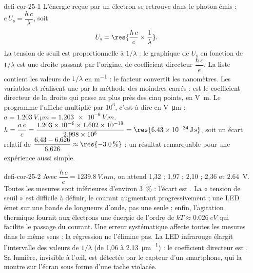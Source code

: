 \begin{blocEdition}{defi-cor-25-1}
L'énergie reçue par un électron se retrouve dans le photon émis : $e\,U_\mathrm{s}=\dfrac{h\,c}{\lambda}$, soit
\[U_\mathrm{s}=\res{\frac{h\,c}{e}\times\frac{1}{\lambda}}.\]
La tension de seuil est proportionnelle à $1/\lambda$ : le graphique de $U_\mathrm{s}$ en fonction de $1/\lambda$ est une droite passant
par l'origine, de coefficient directeur $\dfrac{h\,c}{e}$.
La liste  contient les valeurs de $1/\lambda$ en \unit{m^{-1}} : le facteur  convertit les nanomètres. Les
variables  et  réalisent une  par la méthode des moindres carrés :  est le
coefficient directeur de la droite qui passe au plus près des cinq points, en \unit{V.m}. Le programme l'affiche
multiplié par $10^6$, c'est-à-dire en \unit{V.\micro m} : $a=\qty{1,203}{V.\micro m}=\qty{1,203e-6}{V.m}$.
$h=\dfrac{a\,e}{c}=\dfrac{\num{1.203e-6}\times\num{1.602e-19}}{\num{2.998e8}}=\res{\qty{6,43e-34}{J.s}}$, soit un écart relatif de
$\dfrac{6{,}43-6{,}626}{6{,}626}\approx\res{\qty{-3,0}{\percent}}$ : un résultat remarquable pour une expérience aussi simple.
\end{blocEdition}

\begin{blocEdition}{defi-cor-25-2}
\label{figedition-defi-cor-25-2-1}
Avec $\dfrac{h\,c}{e}=\qty{1239,8}{V.nm}$, on attend 1,32 ; 1,97 ; 2,10 ; 2,36 et \qty{2,64}{V}. Toutes les mesures sont inférieures
d'environ 3~\% : l'écart est . La « tension de seuil » est difficile à définir, le courant augmentant
progressivement ; une LED émet sur une bande de longueurs d'onde, pas une seule ; enfin, l'agitation thermique fournit aux
électrons une énergie de l'ordre de $kT\approx\qty{0,026}{eV}$ qui facilite le passage du courant. Une erreur systématique
affecte toutes les mesures dans le même sens : la régression ne l'élimine pas.
La LED infrarouge élargit l'intervalle des valeurs de $1/\lambda$ (de 1,06 à \qty{2,13}{\micro m^{-1}}) : le coefficient directeur est
. Sa lumière, invisible à l'œil, est détectée par le capteur d'un smartphone, qui la montre sur
l'écran sous forme d'une tache violacée.
\end{blocEdition}

